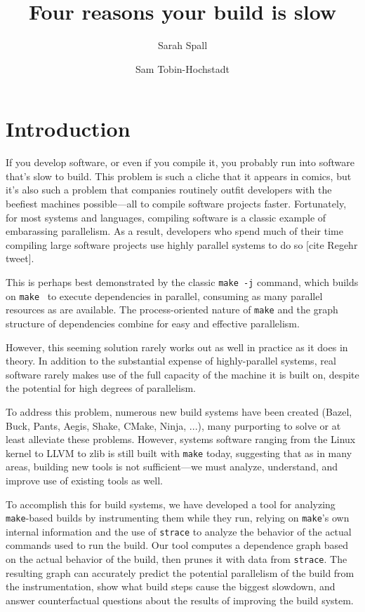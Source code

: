 \documentclass[sigconf,10pt,review,authorversion]{acmart}\settopmatter{printfolios=true,printccs=false,printacmref=false}
\title{Four reasons your build is slow}
\author{Sarah Spall}
\affiliation{Indiana University}
\author{Sam Tobin-Hochstadt}
\affiliation{Indiana University}
\begin{document}
\maketitle

\section{Introduction}

If you develop software, or even if you compile it, you probably run
into software that's slow to build. This problem is such a cliche that
it appears in comics, but it's also such a problem that companies
routinely outfit developers with the beefiest machines possible---all
to compile software projects faster. Fortunately, for most systems and
languages, compiling software is a classic example of embarassing
parallelism. As a result, developers who spend much of their time
compiling large software projects use highly parallel systems to do so
[cite Regehr tweet].

This is perhaps best demonstrated by the classic \verb|make -j|
command, which builds on \verb|make|~\cite{make} to execute
dependencies in parallel, consuming as many parallel resources as are
available. The process-oriented nature of \verb|make| and the graph
structure of dependencies combine for easy and effective parallelism.

However, this seeming solution rarely works out as well in practice as
it does in theory. In addition to the substantial expense of
highly-parallel systems, real software rarely makes use of the full
capacity of the machine it is built on, despite the potential for high
degrees of parallelism.

To address this problem, numerous new build systems have been created
(Bazel, Buck, Pants, Aegis, Shake, CMake, Ninja, ...), many purporting
to solve or at least alleviate these problems. However, systems
software ranging from the Linux kernel to LLVM to zlib is still built
with \verb|make| today, suggesting that as in many areas, building new
tools is not sufficient---we must analyze, understand, and improve use
of existing tools as well.

To accomplish this for build systems, we have developed a tool for
analyzing \verb|make|-based builds by instrumenting them while they
run, relying on \verb|make|'s own internal information and the use of
\verb|strace| to analyze the behavior of the actual commands used to
run the build. Our tool computes a dependence graph based on the
actual behavior of the build, then prunes it with data from
\verb|strace|. The resulting graph can accurately predict the
potential parallelism of the build from the instrumentation, show what
build steps cause the biggest slowdown, and answer counterfactual
questions about the results of improving the build system.
\end{document}
